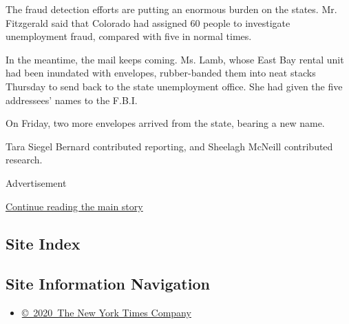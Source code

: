The fraud detection efforts are putting an enormous burden on the
states. Mr. Fitzgerald said that Colorado had assigned 60 people to
investigate unemployment fraud, compared with five in normal times.

In the meantime, the mail keeps coming. Ms. Lamb, whose East Bay rental
unit had been inundated with envelopes, rubber-banded them into neat
stacks Thursday to send back to the state unemployment office. She had
given the five addressees' names to the F.B.I.

On Friday, two more envelopes arrived from the state, bearing a new
name.

Tara Siegel Bernard contributed reporting, and Sheelagh McNeill
contributed research.

Advertisement

\protect\hyperlink{after-bottom}{Continue reading the main story}

\hypertarget{site-index}{%
\subsection{Site Index}\label{site-index}}

\hypertarget{site-information-navigation}{%
\subsection{Site Information
Navigation}\label{site-information-navigation}}

\begin{itemize}
\tightlist
\item
  \href{https://help.nytimes3xbfgragh.onion/hc/en-us/articles/115014792127-Copyright-notice}{©~2020~The
  New York Times Company}
\end{itemize}

